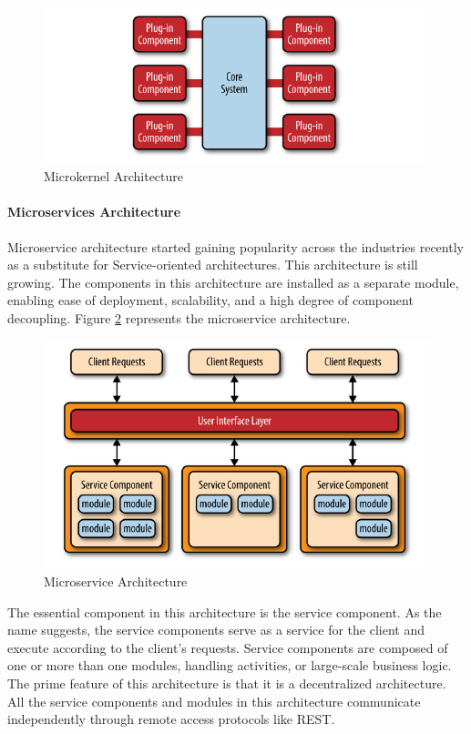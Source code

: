 \documentclass[12pt,a4paper]{article}
\begin{document}
\begin{figure}[H]
\centering
\includegraphics[scale=0.75]{microkernel.PNG}
\caption{Microkernel Architecture \cite{r18}}
\label{microkernel}
\end{figure}


\paragraph{Microservices Architecture}

Microservice architecture started gaining popularity across the industries recently as a substitute for Service-oriented architectures. This architecture is still growing. The components in this architecture are installed as a separate module, enabling ease of deployment, scalability, and a high degree of component decoupling. Figure \ref{microservice} represents the microservice architecture. \cite{r8}

\begin{figure}[H]
\centering
\includegraphics[scale=0.75]{microservice.PNG}
\caption{Microservice Architecture \cite{r18}}
\label{microservice}
\end{figure}

The essential component in this architecture is the service component. As the name suggests, the service components serve as a service for the client and execute according to the client's requests. Service components are composed of one or more than one modules, handling activities, or large-scale business logic. The prime feature of this architecture is that it is a decentralized architecture. All the service components and modules in this architecture communicate independently through remote access protocols like REST. \cite{r18}
\end{document}
